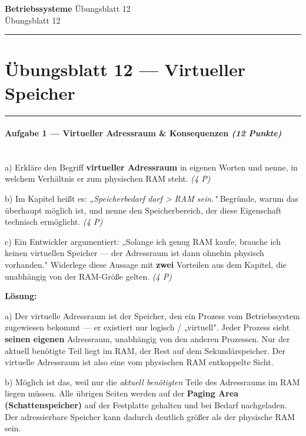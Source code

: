 \documentclass[11pt, a4paper]{article}
\providecommand{\nichttitle}{Übungsblatt}
\providecommand{\nichtsubtitle}{}
\renewcommand{\nichttitle}{Betriebssysteme}
\renewcommand{\nichtsubtitle}{Übungsblatt 12}
\begin{document}
\begin{center}
{\Large\bfseries\color{accent}\nichttitle}
\ifx\nichtsubtitle\empty\else
  \\[2pt]{\normalsize\color{accent!80!black}\nichtsubtitle}
\fi
\\[2pt]
\color{accent}\rule{0.4\linewidth}{0.8pt}\color{black}
\end{center}
\vspace{4pt}


\section{Übungsblatt 12 — Virtueller Speicher}


\noindent\textcolor{rulegray}{\rule{\linewidth}{0.4pt}}


\paragraph{Aufgabe 1 — Virtueller Adressraum \& Konsequenzen \textit{(12 Punkte)}}\mbox{}\\[2pt]

a) Erkläre den Begriff \textbf{virtueller Adressraum} in eigenen Worten und nenne, in welchem Verhältnis er zum physischen RAM steht. \textit{(4 P)}


b) Im Kapitel heißt es: \textit{„Speicherbedarf darf > RAM sein."} Begründe, warum das überhaupt möglich ist, und nenne den Speicherbereich, der diese Eigenschaft technisch ermöglicht. \textit{(4 P)}


c) Ein Entwickler argumentiert: „Solange ich genug RAM kaufe, brauche ich keinen virtuellen Speicher — der Adressraum ist dann ohnehin physisch vorhanden." Widerlege diese Aussage mit \textbf{zwei} Vorteilen aus dem Kapitel, die unabhängig von der RAM-Größe gelten. \textit{(4 P)}


\textbf{Lösung:}


a) Der virtuelle Adressraum ist der Speicher, den ein Prozess vom Betriebssystem zugewiesen bekommt — er existiert nur logisch / „virtuell". Jeder Prozess sieht \textbf{seinen eigenen} Adressraum, unabhängig von den anderen Prozessen. Nur der aktuell benötigte Teil liegt im RAM, der Rest auf dem Sekundärspeicher. Der virtuelle Adressraum ist also eine vom physischen RAM entkoppelte Sicht.


b) Möglich ist das, weil nur die \textit{aktuell benötigten} Teile des Adressraums im RAM liegen müssen. Alle übrigen Seiten werden auf der \textbf{Paging Area (Schattenspeicher)} auf der Festplatte gehalten und bei Bedarf nachgeladen. Der adressierbare Speicher kann dadurch deutlich größer als der physische RAM sein.
\end{document}

